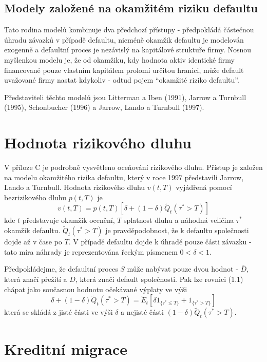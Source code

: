 \subsection{Modely založené na okamžitém riziku defaultu}

Tato rodina modelů kombinuje dva předchozí přístupy - předpokládá částečnou úhradu závazků v případě defaultu, nicméně okamžik defaultu je modelován exogenně a defaultní proces je nezávislý na kapitálové struktuře firmy. Nosnou myšlenkou modelu je, že od okamžiku, kdy hodnota aktiv identické firmy financované pouze vlastním kapitálem prolomí určitou hranici, může default uvažované firmy nastat kdykoliv - odtud pojem ``okamžité riziko defaultu''.

Představiteli těchto modelů jsou Litterman a Iben (1991), Jarrow a Turnbull (1995), Schonbucher (1996) a Jarrow, Lando a Turnbull (1997).

\section{Hodnota rizikového dluhu}

V příloze C je podrobně vysvětleno oceňování rizikového dluhu. Přístup je založen na modelu okamžitého rizika defaultu, který v roce 1997 představili Jarrow, Lando a Turnbull. Hodnota rizikového dluhu $v(t,T)$ vyjádřená pomocí bezrizikového dluhu $p(t,T)$ je
\begin{equation}
v(t,T) = p(t,T)[\delta + (1 - \delta)\tilde{Q}_t(\tau^* > T)]
\end{equation}
kde $t$ představuje okamžik ocenění, $T$ splatnost dluhu a náhodná veličina $\tau^*$ okamžik defaultu. $\tilde{Q}_t(\tau^* > T)$ je pravděpodobnost, že k defaultu společnosti dojde až v čase po $T$. V případě defaultu dojde k úhradě pouze části závazku - tato míra náhrady je reprezentována řeckým písmenem $0 < \delta < 1$.

Předpokládejme, že defaultní proces $S$ může nabývat pouze dvou hodnot - $\overline{D}$, která značí přežití a $D$, která značí default společnosti. Pak lze rovnici (1.1) chápat jako současnou hodnotu očekávané výplaty ve výši
\begin{equation}
\delta + (1 - \delta)\tilde{Q}_t(\tau^* > T) = \tilde{E}_t\left[\delta 1_{\{\tau^* \le T\}} + 1_{\{\tau^* > T\}} \right]
\end{equation}
která se skládá z jisté části ve výši $\delta$ a nejisté části $(1 - \delta)\tilde{Q}_t(\tau^* > T)$.

\section{Kreditní migrace}

